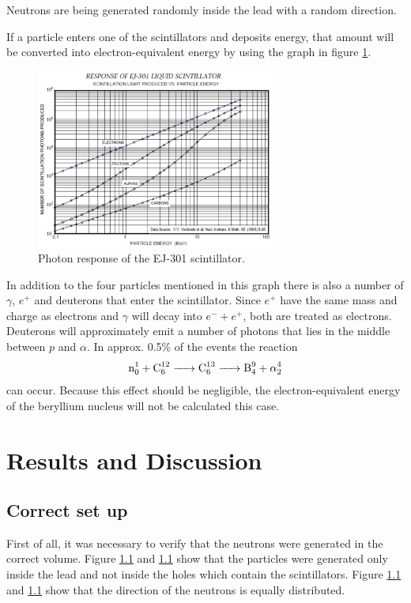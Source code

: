 \documentclass[12pt]{article}
\begin{document}
Neutrons are being generated randomly inside the lead with a random direction.

If a particle enters one of the scintillators and deposits energy, that amount will be converted into electron-equivalent energy by using the graph in figure \ref{fig:photonResponse}.

\begin{figure}[htbp]
	\centering
	\includegraphics[width=0.7\textwidth]{./pics/scintillatorResponse.pdf}
	\caption{Photon response of the EJ-301 scintillator.}
	\label{fig:photonResponse}
\end{figure}
In addition to the four particles mentioned in this graph there is also a number of $\gamma$, $e^+$ and deuterons that enter the scintillator. Since $e^+$ have the same mass and charge as electrons and $\gamma$ will decay into $e^- + e^+$, both are treated as electrons. Deuterons will approximately emit a number of photons that lies in the middle between $p$ and $\alpha$. In approx. 0.5\% of the events the reaction 
\begin{align}
	\ce{n^1_0 + C^{12}_6 -> C^{13}_6 -> B^9_4 + \alpha^4_2 } 
\end{align}
can occur. Because this effect should be negligible, the electron-equivalent energy of the beryllium nucleus will not be calculated this case.

\section{Results and Discussion}

\subsection{Correct set up}

First of all, it was necessary to verify that the neutrons were generated in the correct volume. Figure \ref{} and \ref{} show that the particles were generated only inside the lead and not inside the holes which contain the scintillators. Figure \ref{} and \ref{} show that the direction of the neutrons is equally distributed.
\end{document}
